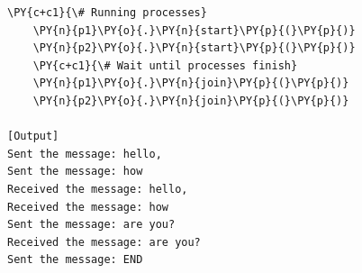 \begin{Verbatim}[label=\makebox{\url{https://github.com/lucabaldini/cmepda/tree/master/slides/latex/snippets/multiprocessing_pipe.py}},commandchars=\\\{\}]
    \PY{c+c1}{\# Running processes}
    \PY{n}{p1}\PY{o}{.}\PY{n}{start}\PY{p}{(}\PY{p}{)}
    \PY{n}{p2}\PY{o}{.}\PY{n}{start}\PY{p}{(}\PY{p}{)}
    \PY{c+c1}{\# Wait until processes finish}
    \PY{n}{p1}\PY{o}{.}\PY{n}{join}\PY{p}{(}\PY{p}{)}
    \PY{n}{p2}\PY{o}{.}\PY{n}{join}\PY{p}{(}\PY{p}{)}

[Output]
Sent the message: hello,
Sent the message: how
Received the message: hello,
Received the message: how
Sent the message: are you?
Received the message: are you?
Sent the message: END
\end{Verbatim}